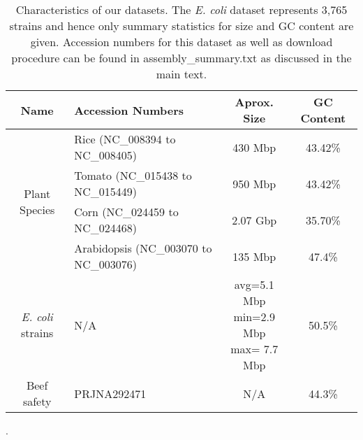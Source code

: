 

    \begin{table*}
      \small
   \centering
   \begin{tabular}{|c|l|c|c|}
     \hline
     {\bf Name} &  {\bf Accession Numbers} & {\bf Aprox. Size} & {\bf GC Content} \\

     \hline
     
     \multirow{4}{*}{Plant Species }
     & Rice  (NC\_008394 to NC\_008405) & 430 Mbp & 43.42\% \\
     & Tomato  (NC\_015438 to NC\_015449) &  950 Mbp & 43.42\% \\
     & Corn  (NC\_024459 to NC\_024468) & 2.07 Gbp & 35.70\% \\
     & Arabidopsis  (NC\_003070 to NC\_003076) & 135 Mbp & 47.4\% \\
     \hline

     \emph{E. coli} strains &  N/A & \pbox{3cm}{avg=5.1 Mbp\\ min=2.9 Mbp\\ max= 7.7 Mbp} & 50.5\% \\

     \hline

     Beef safety &  PRJNA292471 & N/A & 44.3\% \\
     \hline
   \end{tabular}
       \caption{Characteristics of our datasets.  The \emph{E. coli} dataset represents 3,765 strains and hence only summary statistics for size and GC content are given. Accession numbers for this dataset as well as download procedure can be found in assembly\_summary.txt as discussed in the main text.}.
  \label{tbl-datasets}
   \end{table*}



